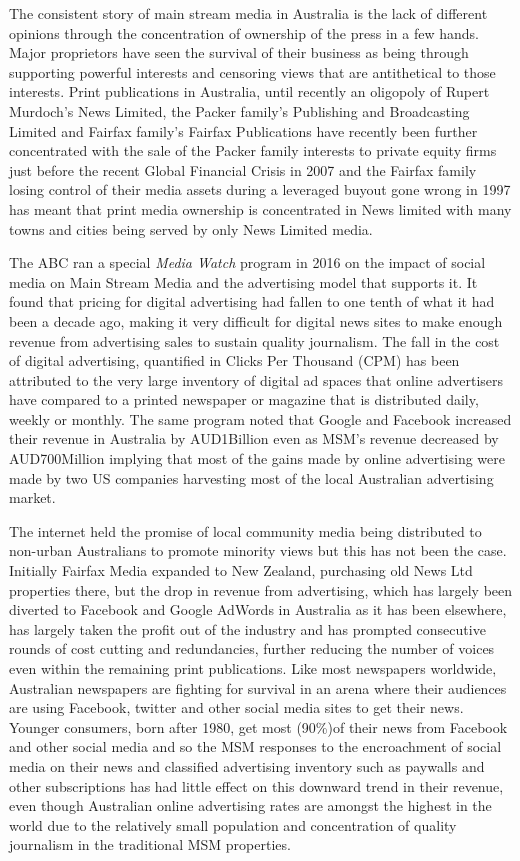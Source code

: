 The consistent story of main stream media in Australia is the lack of different opinions through the concentration of ownership of the press in a few hands. Major proprietors have seen the survival of their business as being through supporting powerful interests and censoring views that are antithetical to those interests. Print publications in Australia, until recently an oligopoly of Rupert Murdoch's News Limited, the Packer family's Publishing and Broadcasting Limited and Fairfax family's Fairfax Publications have recently been further concentrated with the sale of the Packer family interests to private equity firms just before the recent Global Financial Crisis in 2007\cite{RefWorks:429} and the Fairfax family losing control of their media assets during a leveraged buyout gone wrong in 1997\cite{RefWorks:430} has meant that print media ownership is concentrated in News limited with many towns and cities being served by only News Limited media. 

The ABC ran a special \textit{Media Watch} program in 2016 on the impact of social media on Main Stream Media and the advertising model that supports it. It found that pricing for digital advertising had fallen to one tenth of what it had been a decade ago, making it very difficult for digital news sites to make enough revenue from advertising sales to sustain quality journalism. The fall in the cost of digital advertising, quantified in Clicks Per Thousand (CPM) has been attributed to the very large inventory of digital ad spaces that online advertisers have compared to a printed newspaper or magazine that is distributed daily, weekly or monthly\cite{RefWorks:456}. The  same program noted that Google and Facebook increased their revenue in Australia by AUD1Billion even as MSM's revenue decreased by AUD700Million implying that most of the gains made by online advertising were made by two US companies harvesting most of the local Australian advertising market.

The internet held the promise of local community media being distributed to non-urban Australians to promote minority views but this has not been the case. Initially Fairfax Media expanded to New Zealand, purchasing old News Ltd properties there, but the drop in revenue from advertising, which has largely been diverted to Facebook and Google AdWords in Australia as it has been elsewhere, has largely taken the profit out of the industry and has prompted consecutive rounds of cost cutting and redundancies, further reducing the number of voices even within the remaining print publications. Like most newspapers worldwide, Australian newspapers are fighting for survival in an arena where their audiences are using Facebook, twitter and other social media sites to get their news. Younger consumers, born after 1980, get most (90\%\cite{RefWorks:456})of their news from Facebook and other social media and so the MSM responses to the encroachment of social media on their news and classified advertising inventory such as paywalls and other subscriptions has had little effect on this downward trend in their revenue, even though Australian online advertising rates are amongst the highest in the world due to the relatively small population and concentration of quality journalism in the traditional MSM properties\cite{AdNews2018}.

